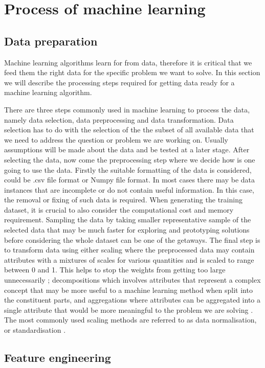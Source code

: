 \section{Process of machine learning}
\label{Process}
\subsection{Data preparation}
Machine learning algorithms learn for from data, therefore it is critical that we feed them the right data for the specific problem we want to solve. In this section we will describe the processing steps required for getting data ready for a machine learning algorithm.

There are three steps commonly used in machine learning to process the data, namely data selection, data preprocessing  and data transformation. Data selection has to do with the selection of the the subset of all available data that we need to address the question or problem we are working on. Usually assumptions will be made  about the data and be tested at a later stage. After selecting the data, now come the preprocessing step where we decide how is one going to use the data. Firstly the suitable formatting of the data is considered, could be .csv file format or Numpy file format. In most cases there may be data instances that are incomplete or do not contain useful information. In this case, the removal or fixing of such data is required. When generating the training dataset, it is crucial to also consider the computational cost and memory requirement. Sampling the data by taking smaller representative sample of the selected data that may be much faster for exploring and prototyping solutions before considering the whole dataset can be one of the getaways. The final step is to transform data using either scaling where the preprocessed data may contain attributes with a mixtures of scales for various quantities and is scaled to range between 0 and 1. This helps to stop the weights from getting too large unnecessarily \citep{marsland2015machine}; decompositions which involves attributes that represent a complex concept that may be more useful to a machine learning method when split into the constituent parts, and  aggregations where attributes can be aggregated into a single attribute that would be more meaningful to the problem we are solving \citep{brownlee2013prepare}. The most commonly used scaling methods are referred to as data normalisation, or standardisation \citep{marsland2015machine}.
    
\subsection{Feature engineering}

